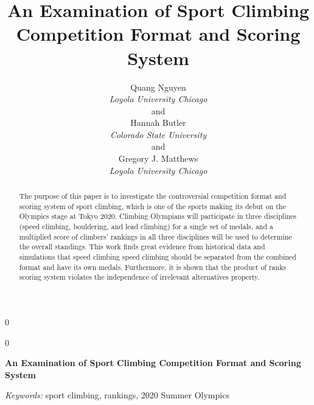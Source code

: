\documentclass[12pt]{article}
\newcommand{\blind}{0}
\begin{document}
\def\spacingset#1{\renewcommand{\baselinestretch}%
{#1}\small\normalsize} \spacingset{1}



\blind
{
  \title{\bf An Examination of Sport Climbing Competition Format and
Scoring System}

  \author{
        Quang Nguyen \\
    \textit{Loyola University Chicago}\\
     and \\     Hannah Butler \\
    \textit{Colorado State University}\\
     and \\     Gregory J. Matthews \\
    \textit{Loyola University Chicago}\\
      }
  \maketitle
} \fi

\blind
{
  \bigskip
  \bigskip
  \bigskip
  \begin{center}
    {\LARGE\bf An Examination of Sport Climbing Competition Format and
Scoring System}
  \end{center}
  \medskip
} \fi

\bigskip
\begin{abstract}
The purpose of this paper is to investigate the controversial
competition format and scoring system of sport climbing, which is one of
the sports making its debut on the Olympics stage at Tokyo 2020.
Climbing Olympians will participate in three disciplines (speed
climbing, bouldering, and lead climbing) for a single set of medals, and
a multiplied score of climbers' rankings in all three disciplines will
be used to determine the overall standings. This work finds great
evidence from historical data and simulations that speed climbing speed
climbing should be separated from the combined format and have its own
medals. Furthermore, it is shown that the product of ranks scoring
system violates the independence of irrelevant alternatives property.
\end{abstract}

\noindent%
{\it Keywords:} sport climbing, rankings, 2020 Summer Olympics
\vfill

\newpage
\spacingset{1.45} %
\end{document}
